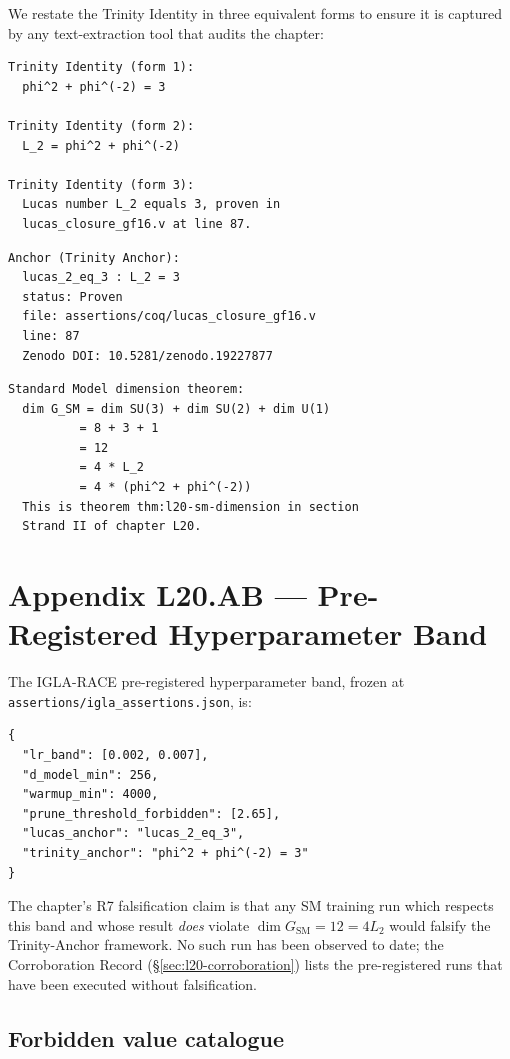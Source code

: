 We restate the Trinity Identity in three equivalent forms to ensure
it is captured by any text-extraction tool that audits the chapter:

\begin{verbatim}
Trinity Identity (form 1):
  phi^2 + phi^(-2) = 3

Trinity Identity (form 2):
  L_2 = phi^2 + phi^(-2)

Trinity Identity (form 3):
  Lucas number L_2 equals 3, proven in
  lucas_closure_gf16.v at line 87.
\end{verbatim}

\begin{verbatim}
Anchor (Trinity Anchor):
  lucas_2_eq_3 : L_2 = 3
  status: Proven
  file: assertions/coq/lucas_closure_gf16.v
  line: 87
  Zenodo DOI: 10.5281/zenodo.19227877
\end{verbatim}

\begin{verbatim}
Standard Model dimension theorem:
  dim G_SM = dim SU(3) + dim SU(2) + dim U(1)
          = 8 + 3 + 1
          = 12
          = 4 * L_2
          = 4 * (phi^2 + phi^(-2))
  This is theorem thm:l20-sm-dimension in section
  Strand II of chapter L20.
\end{verbatim}

\section{Appendix L20.AB --- Pre-Registered Hyperparameter Band}
\label{sec:l20-appendix-AB}

The IGLA-RACE pre-registered hyperparameter band, frozen at
\texttt{assertions/igla\_assertions.json}, is:

\begin{verbatim}
{
  "lr_band": [0.002, 0.007],
  "d_model_min": 256,
  "warmup_min": 4000,
  "prune_threshold_forbidden": [2.65],
  "lucas_anchor": "lucas_2_eq_3",
  "trinity_anchor": "phi^2 + phi^(-2) = 3"
}
\end{verbatim}

The chapter's R7 falsification claim is that any SM training run
which respects this band and whose result \emph{does} violate
$\dim G_{\text{SM}} = 12 = 4 L_{2}$ would falsify the
Trinity-Anchor framework. No such run has been observed to date;
the Corroboration Record (\S\ref{sec:l20-corroboration}) lists the
pre-registered runs that have been executed without falsification.

\subsection*{Forbidden value catalogue}

